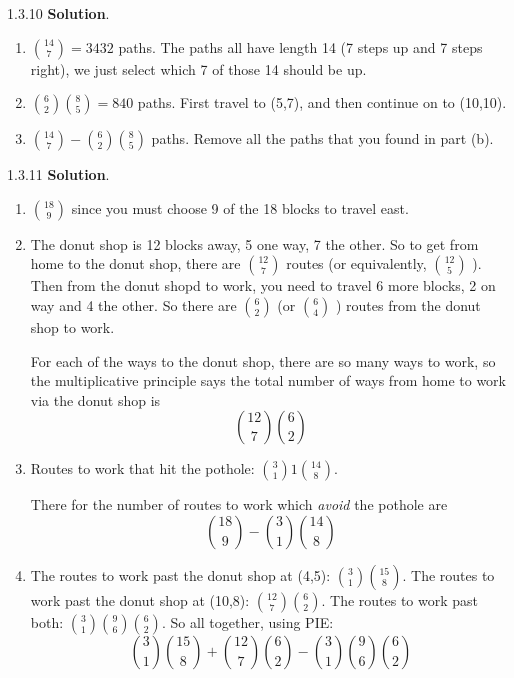\documentclass[11pt,]{book}
\theoremstyle{ptxplainnotitle}
\theoremstyle{ptxplaintitle}
\theoremstyle{ptxdefinitionnotitle}
\theoremstyle{ptxdefinitiontitle}
\theoremstyle{ptxdefinitionnotitle}
\theoremstyle{ptxdefinitiontitle}
\theoremstyle{ptxdefinitionnotitle}
\theoremstyle{ptxdefinitiontitle}
\theoremstyle{ptxdefinitiontitlenonumber}
\theoremstyle{ptxdefinitiontitlenonumber}
\numberwithin{equation}{chapter}
\begin{document}
\begin{divisionexercise}{1.3.10}
\textbf{Solution}.\quad%
\hypertarget{p-1466}{}%
\leavevmode%
\begin{enumerate}[label=\alph*.]
\item\hypertarget{li-634}{}\hypertarget{p-1467}{}%
\({14 \choose 7} = 3432\) paths.  The paths all have length 14 (7 steps up and 7 steps right), we just select which 7 of those 14 should be up.%
\item\hypertarget{li-635}{}\hypertarget{p-1468}{}%
\({6 \choose 2}{8\choose 5} = 840\) paths.  First travel to (5,7), and then continue on to (10,10).%
\item\hypertarget{li-636}{}\hypertarget{p-1469}{}%
\({14 \choose 7} - {6\choose 2}{8 \choose 5}\) paths.  Remove all the paths that you found in part (b).%
\end{enumerate}
%
\end{divisionexercise}%
\begin{divisionexercise}{1.3.11}
\textbf{Solution}.\quad%
\hypertarget{p-1476}{}%
\leavevmode%
\begin{enumerate}[label=(\alph*)]
\item\hypertarget{li-641}{}\hypertarget{p-1477}{}%
\({18 \choose 9}\) since you must choose 9 of the 18 blocks to travel east.%
\item\hypertarget{li-642}{}\hypertarget{p-1478}{}%
The donut shop is 12 blocks away, 5 one way, 7 the other.  So to get from home to the donut shop, there are \({12 \choose 7}\) routes (or equivalently, \({12 \choose 5}\) ).  Then from the donut shopd to work, you need to travel 6 more blocks, 2 on way and 4 the other.  So there are \({6 \choose 2}\) (or \({6 \choose 4}\) ) routes from the donut shop to work.%
\par
\hypertarget{p-1479}{}%
For each of the ways to the donut shop, there are so many ways to work, so the multiplicative principle says the total number of ways from home to work via the donut shop is%
\begin{equation*}
{12 \choose 7}{6 \choose 2}
\end{equation*}
%
\item\hypertarget{li-643}{}\hypertarget{p-1480}{}%
Routes to work that hit the pothole: \({3 \choose 1}1{14 \choose 8}\).%
\par
\hypertarget{p-1481}{}%
There for the number of routes to work which {\em avoid} the pothole are%
\begin{equation*}
{18 \choose 9} - {3 \choose 1}{14 \choose 8}
\end{equation*}
%
\item\hypertarget{li-644}{}\hypertarget{p-1482}{}%
The routes to work past the donut shop at (4,5): \({3\choose 1}{15 \choose 8}\).  The routes to work past the donut shop at (10,8): \({12 \choose 7}{6 \choose 2}\).  The routes to work past both: \({3\choose 1}{9 \choose 6}{6 \choose 2}\).  So all together, using PIE:%
\begin{equation*}
{3\choose 1}{15 \choose 8} + {12 \choose 7}{6 \choose 2} - {3\choose 1}{9 \choose 6}{6 \choose 2}
\end{equation*}
%
\end{enumerate}
%
\end{divisionexercise}%
\end{document}
